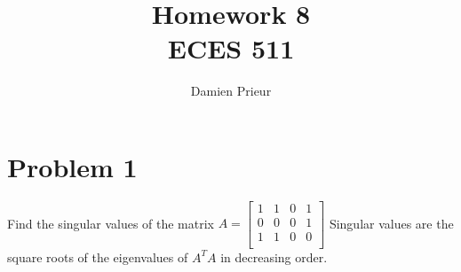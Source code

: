 \documentclass{article}
\author{Damien Prieur}
\title{Homework 8 \\ ECES 511}
\date{}
\begin{document}
\maketitle

\section*{Problem 1}
Find the singular values of the matrix
$A
=
\begin{bmatrix}
1 & 1 & 0 & 1 \\
0 & 0 & 0 & 1 \\
1 & 1 & 0 & 0 \\
\end{bmatrix}
$
\newline
Singular values are the square roots of the eigenvalues of $A^TA$ in decreasing order.
\end{document}
